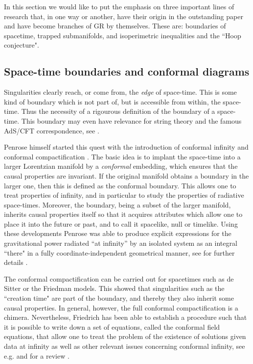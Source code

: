 \documentclass[12pt]{iopart}
\begin{document}
In this section we would like to put the emphasis on three important lines of research that, in one way or another, have their origin in the outstanding paper \cite{P} and have become branches of GR by themselves. These are: boundaries of spacetime, trapped submanifolds, and isoperimetric inequalities and the ``Hoop conjecture".


\subsection{Space-time boundaries and conformal diagrams}\label{subsec:boundary}
Singularities clearly reach, or come from, the {\em edge} of space-time. This is 
some kind of boundary which is not part of, but is accessible from within, the space-time.
 Thus the necessity of a rigourous definition of the boundary of a space-time. This boundary may even have relevance for string theory and the famous AdS/CFT correspondence, see \cite{MR,MR1}.
 
Penrose himself started this quest with the introduction of conformal infinity and conformal compactification \cite{P0,P00,P3,Fra}. The basic idea is to implant the space-time into a larger Lorentzian manifold by a {\it conformal} embedding, which ensures that the causal properties are invariant. If the original manifold obtains a boundary in the larger one, then this is defined as the conformal boundary. This allows one to treat properties of infinity, and in particular to study the properties of radiative space-times. Moreover, the boundary, being a subset of the larger manifold, inherits causal properties itself so that it acquires attributes which allow one to place it into the future or past, and to call it spacelike, null or timelike. Using these developments Penrose was able to produce explicit
expressions for the gravitational power 
radiated ``at infinity'' by an isolated system as an integral ``there" 
\cite{P3} in a fully coordinate-independent 
geometrical manner, see for further details \cite{Fra,STEWART}. 


The conformal compactification can be carried out for spacetimes
such as de Sitter or the Friedman models.  This showed that singularities such as the ``creation time" are part of the boundary, and thereby they also inherit some causal properties.  In general,
however, the full conformal compactification is a chimera. Nevertheless, Friedrich has been
able to establish a procedure such that it is possible to write down a set
of equations, called the conformal field equations, that allow one to treat the problem of the existence of solutions given data at infinity as well as other relevant issues concerning conformal infinity, see e.g.  \cite{Frie,Frie0,Frie1,Frie2,Frie3} and for a review  \cite{Fra}.
\end{document}
